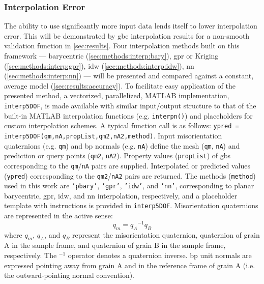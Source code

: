 \documentclass[preprint,12pt]{elsarticle}
\begin{document}
\subsubsection{Interpolation Error} \label{sec:intro:interp-error}
The ability to use significantly more input data lends itself to lower interpolation error. This will be demonstrated by \gls{gbe} interpolation results for a non-smooth validation function in \cref{sec:results}.
Four interpolation methods built on this framework --- barycentric (\cref{sec:methods:interp:bary}), \gls{gpr} or Kriging (\cref{sec:methods:interp:gpr}), \gls{idw} (\cref{sec:methods:interp:idw}), \gls{nn} (\cref{sec:methods:interp:nn}) --- will be presented and compared against a constant, average model (\cref{sec:results:accuracy}). To facilitate easy application of the presented method, a vectorized, parallelized, MATLAB implementation, \texttt{interp5DOF}, is made available \cite{bairdFiveDegreeofFreedom5DOF2020} with similar input/output structure to that of the built-in MATLAB interpolation functions (e.g. \texttt{interpn()}) and placeholders for custom interpolation schemes. A typical function call is as follows: \texttt{ypred = interp5DOF(qm,nA,propList,qm2,nA2,method)}. Input misorientation quaternions (e.g. \texttt{qm}) and \gls{bp} normals (e.g. \texttt{nA}) define the mesh (\texttt{qm}, \texttt{nA}) and prediction or query points (\texttt{qm2}, \texttt{nA2}). Property values (\texttt{propList}) of \glspl{gb} corresponding to the \texttt{qm}/\texttt{nA} pairs are supplied. Interpolated or predicted values (\texttt{ypred}) corresponding to the \texttt{qm2}/\texttt{nA2} pairs are returned. The methods (\texttt{method}) used in this work are \texttt{'pbary'}, \texttt{'gpr'}, \texttt{'idw'}, and \texttt{'nn'}, corresponding to planar barycentric, \gls{gpr}, \gls{idw}, and \gls{nn} interpolation, respectively, and a placeholder template with instructions is provided in \texttt{interp5DOF}. Misorientation quaternions are represented in the active sense:
\begin{equation}
    q_m = {q_A}^{-1}q_B
\end{equation}
where $q_m$, $q_A$, and $q_B$ represent the misorientation quaternion, quaternion of grain A in the sample frame, and quaternion of grain B in the sample frame, respectively. The $^{-1}$ operator denotes a quaternion inverse. \Gls{bp} unit normals are expressed pointing away from grain A and in the reference frame of grain A (i.e. the outward-pointing normal convention).
\end{document}
